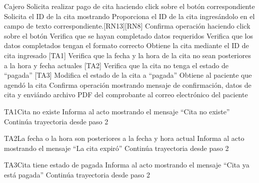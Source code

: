 \begin{UCtrayectoria}{Cajero}
		\UCpaso[\UCactor] Solicita realizar pago de cita haciendo click sobre el botón correspondiente
		\UCpaso Solicita el ID de la cita mostrando 
		\UCpaso[\UCactor] Proporciona el ID de la cita ingresándolo en el campo de texto correspondiente.[RN13][RN8]
		\UCpaso[\UCactor] Confirma operación haciendo click sobre el botón 
		\UCpaso Verifica que se hayan completado datos requeridos
		\UCpaso Verifica que los datos completados tengan el formato correcto
		\UCpaso Obtiene la cita mediante el ID de cita ingresado [TA1]
		\UCpaso Verifica que la fecha y la hora de la cita no sean posteriores a la hora y fecha actuales [TA2]
		\UCpaso Verifica que la cita no tenga el estado de ``pagada'' [TA3]
		\UCpaso Modifica el estado de la cita a ``pagada''
		\UCpaso Obtiene al paciente que agendó la cita 
		\UCpaso Confirma operación mostrando mensaje de confirmación, datos de cita y enviándo archivo PDF del comprobante  al correo electrónico del paciente
\end{UCtrayectoria}

\begin{UCtrayectoriaA}{TA1}{Cita no existe}
	\UCpaso Informa al acto mostrando el mensaje ``Cita no existe''
	\UCpaso Continúa trayectoria desde paso 2
	
\end{UCtrayectoriaA}
	
\begin{UCtrayectoriaA}{TA2}{La fecha o la hora son posteriores a la fecha y hora actual}
	\UCpaso Informa al acto mostrando el mensaje ``La cita expiró''
	\UCpaso Continúa trayectoria desde paso 2
	
\end{UCtrayectoriaA}

\begin{UCtrayectoriaA}{TA3}{Cita tiene estado de pagada}
	\UCpaso Informa al acto mostrando el mensaje ``Cita ya está pagada''
	\UCpaso Continúa trayectoria desde paso 2
	
\end{UCtrayectoriaA}
